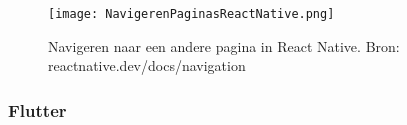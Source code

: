\begin{figure}
    \texttt{[image: NavigerenPaginasReactNative.png]}
    \caption{Navigeren naar een andere pagina in React Native. Bron: reactnative.dev/docs/navigation}
    \label{fig:navigerenReactNative}
\end{figure}

\subsubsection{Flutter}
\label{subsubsec:navigatieFlutter}






